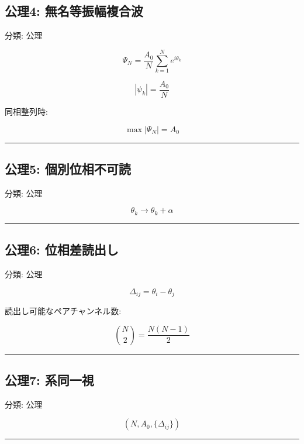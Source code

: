\documentclass[
  a4paper,
]{ltjsarticle}
\begin{document}
\subsection{公理4:
無名等振幅複合波}\label{ux516cux74064-ux7121ux540dux7b49ux632fux5e45ux8907ux5408ux6ce2}

分類: 公理

\[
\Psi_N=\frac{A_0}{N}\sum_{k=1}^{N}e^{i\theta_k}
\]

\[
|\psi_k|=\frac{A_0}{N}
\]

同相整列時:

\[
\max|\Psi_N|=A_0
\]

\begin{center}\rule{0.5\linewidth}{0.5pt}\end{center}

\subsection{公理5:
個別位相不可読}\label{ux516cux74065-ux500bux5225ux4f4dux76f8ux4e0dux53efux8aad}

分類: 公理

\[
\theta_k\rightarrow\theta_k+\alpha
\]

\begin{center}\rule{0.5\linewidth}{0.5pt}\end{center}

\subsection{公理6:
位相差読出し}\label{ux516cux74066-ux4f4dux76f8ux5deeux8aadux51faux3057}

分類: 公理

\[
\Delta_{ij}=\theta_i-\theta_j
\]

読出し可能なペアチャンネル数:

\[
\binom{N}{2}=\frac{N(N-1)}{2}
\]

\begin{center}\rule{0.5\linewidth}{0.5pt}\end{center}

\subsection{公理7:
系同一視}\label{ux516cux74067-ux7cfbux540cux4e00ux8996}

分類: 公理

\[
(N,A_0,\{\Delta_{ij}\})
\]

\begin{center}\rule{0.5\linewidth}{0.5pt}\end{center}
\end{document}
